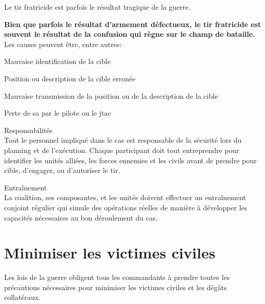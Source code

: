 \e
	\item Le tir fratricide est parfois le résultat tragique de la guerre.
	\item
	\textbf{Bien que parfois le résultat d'armement défectueux, le tir fratricide est souvent le résultat de la confusion qui règne sur le champ de bataille.}
	Les causes peuvent être, entre autres:
	\ee
		\item Mauvaise identification de la cible
		\item Position ou description de la cible erronée
		\item Mauvaise transmission de la position ou de la description de la cible
		\item Perte de \gls{sa} par le pilote ou le \gls{jtac}
	\ed
	\item Responsabilités \\
	Tout le personnel impliqué dans le \gls{cas} est responsable de la sécurité lors du planning et de l'exécution. Chaque participant doit tout entreprendre pour identifier les unités alliées, les forces ennemies et les civils avant de prendre pour cible, d'engager, ou d'autoriser le tir.
	\item Entraînement \\
	La coalition, ses composantes, et les unités doivent effectuer un entraînement conjoint régulier qui simule des opérations réelles de manière à développer les capacités nécessaires au bon déroulement du \gls{cas}.	
\ed

\section{Minimiser les victimes civiles}
\e
	\item Les lois de la guerre obligent tous les commandants à prendre toutes les précautions nécessaires pour minimiser les victimes civiles et les dégâts collatéraux.
\ed

